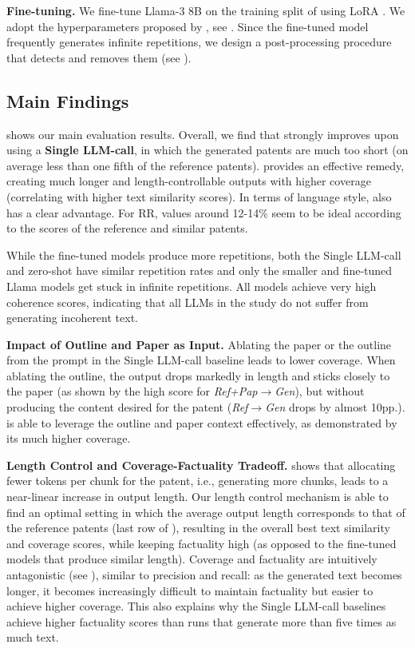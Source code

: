 \noindent\textbf{Fine-tuning. }
We fine-tune Llama-3 8B on the training split of \DatasetName using LoRA \cite{huLoRALowRankAdaptation2021}. 
We adopt the hyperparameters proposed by \citet{tribesHyperparameterOptimizationLarge2024}, see . 
Since the fine-tuned model frequently generates infinite repetitions, we design a post-processing procedure that detects and removes them (see ).


\subsection{Main Findings}

 shows our main evaluation results.
Overall, we find that \textbf{\MethodName} strongly improves upon using a \textbf{Single LLM-call},
in which the generated patents are much too short (on average less than one fifth of the reference patents).
\MethodName provides an effective remedy, creating much longer and length-controllable outputs with higher coverage (correlating with higher text similarity scores).
In terms of language style, \MethodName also has a clear advantage.
For RR, values around 12-14\% %
seem to be ideal according to the scores of the reference and similar patents.

While the fine-tuned models produce more repetitions, both the Single LLM-call and zero-shot \MethodName have similar repetition rates and only the smaller and fine-tuned Llama models get stuck in infinite repetitions.
All models achieve very high coherence scores, indicating that all LLMs in the study do not suffer from generating incoherent text.

\noindent\textbf{Impact of Outline and Paper as Input.}
Ablating the paper or the outline from the prompt in the Single LLM-call baseline leads to lower coverage.
When ablating the outline, the output drops markedly in length and sticks closely to the paper (as shown by the high score for \textit{Ref+Pap$\rightarrow$Gen}), but without producing the content desired for the patent (\textit{Ref$\rightarrow$Gen} drops by almost 10pp.).
\MethodName is able to leverage the outline and paper context effectively, as demonstrated by its much higher coverage.


\noindent\textbf{Length Control and Coverage-Factuality Tradeoff.}
 shows that
allocating fewer tokens per chunk for the patent, i.e.,
generating more chunks, leads to a near-linear increase in output length.
Our length control mechanism is able to find an optimal setting in which the average output length corresponds to that of the reference patents (last row of ), resulting in the overall best text similarity and coverage scores, while keeping factuality high (as opposed to the fine-tuned models that produce similar length).
Coverage and factuality are intuitively antagonistic (see ), similar to precision and recall:
as the generated text becomes longer, it becomes increasingly difficult to maintain factuality but easier to achieve higher coverage.
This also explains why the Single LLM-call baselines achieve higher factuality scores than \MethodName runs that generate more than five times as much text.


